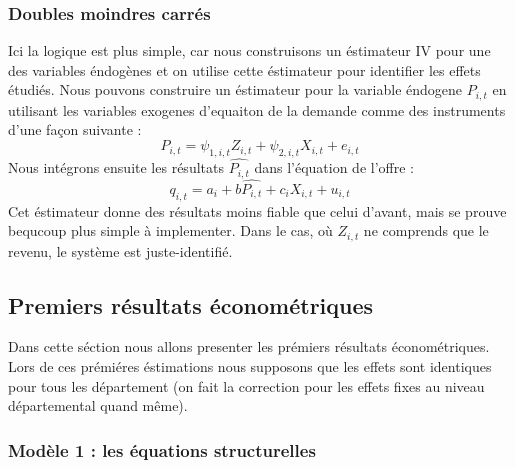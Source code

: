 \documentclass[11pt, a4paper]{article}
\begin{document}
\subsubsection{Doubles moindres carrés}
Ici la logique est plus simple, car nous construisons un éstimateur IV pour une des variables éndogènes et on utilise cette éstimateur pour identifier les effets étudiés.
Nous pouvons construire un éstimateur pour la variable éndogene $P_{i,t}$ en utilisant les variables exogenes d'equaiton de la demande comme des instruments d'une façon suivante :
\begin{equation*}
  P_{i,t} = \psi_{1,i,t} Z_{i,t} + \psi_{2,i,t} X_{i,t} + e_{i,t}
\end{equation*}
Nous intégrons ensuite les résultats $\hat{P_{i,t}}$ dans l'équation de l'offre :
\begin{equation*}
  q_{i,t} = a_i + b \hat{P_{i,t}} + c_i X_{i,t} + u_{i,t}
\end{equation*}
Cet éstimateur donne des résultats moins fiable que celui d'avant, mais se prouve bequcoup plus simple à implementer.
Dans le cas, où $Z_{i,t}$ ne comprends que le revenu, le système est juste-identifié.

\subsection{Premiers résultats économétriques}
Dans cette séction nous allons presenter les prémiers résultats économétriques.
Lors de ces prémiéres éstimations nous supposons que les effets sont identiques pour tous les département (on fait la correction pour les effets fixes au niveau départemental quand même).

\subsubsection{Modèle 1 : les équations structurelles}
\end{document}
